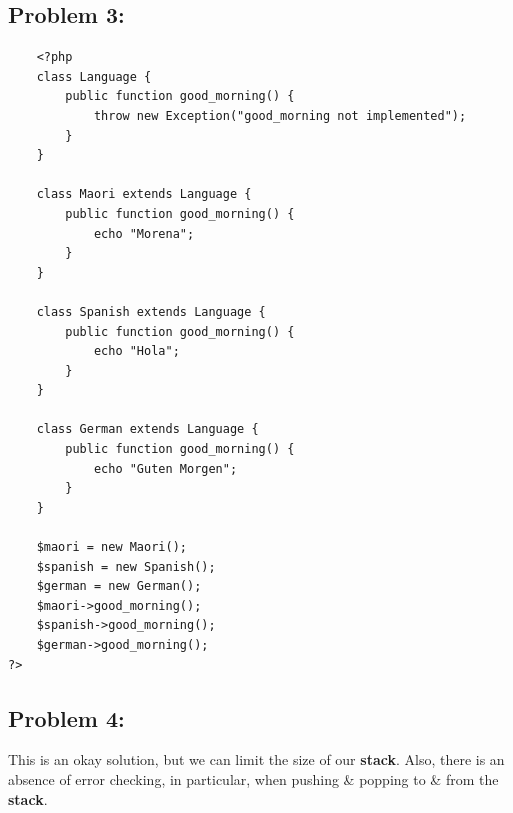 \documentclass{article}
\begin{document}
\subsection*{Problem 3:} 
\begin{verbatim}
    <?php
    class Language {
        public function good_morning() {
            throw new Exception("good_morning not implemented");
        }
    }    

    class Maori extends Language {
        public function good_morning() {
            echo "Morena";
        }
    }

    class Spanish extends Language {
        public function good_morning() {
            echo "Hola";
        }
    }

    class German extends Language {
        public function good_morning() {
            echo "Guten Morgen";
        }
    }
        
    $maori = new Maori();
    $spanish = new Spanish();
    $german = new German();
    $maori->good_morning();
    $spanish->good_morning();
    $german->good_morning();
?>
\end{verbatim}

\subsection*{Problem 4:} 

This is an okay solution, but we can limit the size of our \textbf{stack}. Also, there is an absence of error checking, in particular, when pushing \& popping to \& from the \textbf{stack}. 
\end{document}
